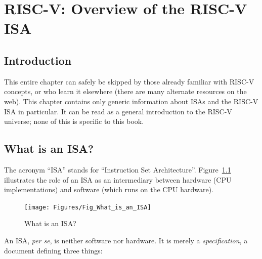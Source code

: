 

\chapter{RISC-V: Overview of the RISC-V ISA}



\setcounter{page}{1}
\renewcommand{\thepage}{\arabic{chapter}-\arabic{page}}

\label{ch_ISA}


\section{Introduction}

This entire chapter can safely be skipped by those already familiar
with RISC-V concepts, or who learn it elsewhere (there are many
alternate resources on the web).  This chapter contains only generic
information about ISAs and the RISC-V ISA in particular.  It can be
read as a general introduction to the RISC-V universe; none of this is
specific to this book.


\section{What is an ISA?}


The acronym ``ISA'' stands for ``Instruction Set Architecture''.
Figure~\ref{Fig_What_is_an_ISA} illustrates the role of an ISA as an
intermediary between hardware (CPU implementations) and software
(which runs on the CPU hardware).
\begin{figure}[htbp]
  \centerline{\texttt{[image: Figures/Fig\_What\_is\_an\_ISA]}}
  \caption{\label{Fig_What_is_an_ISA} What is an ISA?}
\end{figure}

An ISA, \emph{per se}, is neither software nor hardware.  It is merely
a \emph{specification}, a document defining three things:

